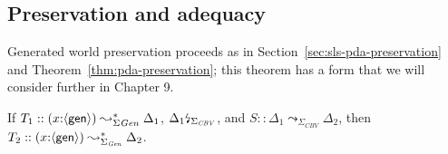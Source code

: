 \subsection{Preservation and adequacy}
\label{sec:nat-ssos-adequacy-pres}

Generated world preservation proceeds as in
Section~\ref{sec:sls-pda-preservation} and
Theorem~\ref{thm:pda-preservation}; this theorem has a form that
we will consider further in Chapter 9.

\bigskip
\begin{theorem}[Preservation]\label{thm:adequate-pres}
  If $T_1 :: (x{:}\langle {\sf gen} \rangle) \leadsto^*_{\Sigma{\it Gen}} \Delta_1$,
  ${\Delta_1}{\mbox{\lightning}}_{\Sigma_{\it CBV}}$, and 
  $S :: \Delta_1 \leadsto_{\Sigma_{CBV}} \Delta_2$, then
  $T_2 :: (x{:}\langle {\sf gen} \rangle) \leadsto^*_{\Sigma_{\it Gen}} \Delta_2$.
\end{theorem}
\bigskip









